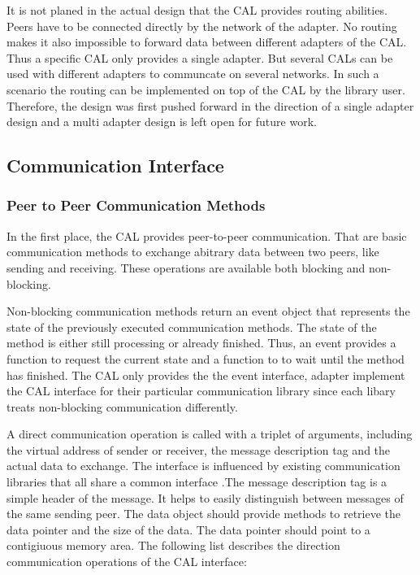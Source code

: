It is not planed in the actual design that the CAL provides routing
abilities. Peers have to be connected directly by the network of the
adapter. No routing makes it also impossible to forward data between
different adapters of the CAL. Thus a specific CAL only provides a
single adapter. But several CALs can be used with different adapters
to communcate on several networks. In such a scenario the routing can
be implemented on top of the CAL by the library user. Therefore, the
design was first pushed forward in the direction of a single adapter
design and a multi adapter design is left open for future work.


\subsection{Communication Interface}
\label{sec:cal_comm}
\subsubsection{Peer to Peer Communication Methods}

In the first place, the CAL provides peer-to-peer communication. That
are basic communication methods to exchange abitrary data between two
peers, like sending and receiving.  These operations are available
both blocking and non-blocking.

Non-blocking communication methods return an event object that represents
the state of the previously executed communication methods. The state
of the method is either still processing or already finished. Thus, an
event provides a function to request the current state and a function
to to wait until the method has finished. The CAL only provides the
the event interface, adapter implement the CAL interface for their
particular communication library since each libary treats non-blocking
communication differently.

A direct communication operation is called with a triplet of
arguments, including the virtual address of sender or receiver, the
message description tag and the actual data to exchange.  The
interface is influenced by existing communication libraries that all
share a common interface \cite{ref:boost_mpi, ref:boost_asio,
  ref:zmq}.The message description tag is a simple header of the
message. It helps to easily distinguish between messages of the same
sending peer.  The data object should provide methods to retrieve the
data pointer and the size of the data. The data pointer should point
to a contigiuous memory area. The following list describes the
direction communication operations of the CAL interface:

